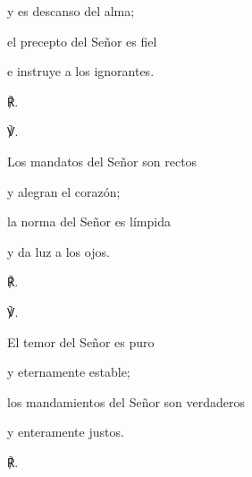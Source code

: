			\begin{readtabbed}y es descanso del alma; \end{readtabbed}
			
			\begin{readtabbed}el precepto del Señor es fiel \end{readtabbed}
			
			\begin{readtabbed}e instruye a los ignorantes. \begin{readred}℟.\end{readred}\end{readtabbed}
			
			\begin{readbody}\begin{readred}℣.\end{readred} Los mandatos del Señor son rectos \end{readbody}
			
			\begin{readtabbed}y alegran el corazón; \end{readtabbed}
			
			\begin{readtabbed}la norma del Señor es límpida \end{readtabbed}
			
			\begin{readtabbed}y da luz a los ojos. \begin{readred}℟.\end{readred}\end{readtabbed}
			
			\begin{readbody}\begin{readred}℣.\end{readred} El temor del Señor es puro \end{readbody}
			
			\begin{readtabbed}y eternamente estable; \end{readtabbed}
			
			\begin{readtabbed}los mandamientos del Señor son verdaderos \end{readtabbed}
			
			\begin{readtabbed}y enteramente justos. \begin{readred}℟.\end{readred}\end{readtabbed}
			
